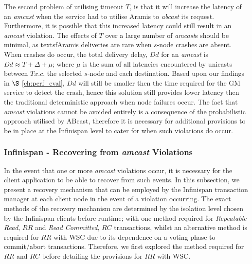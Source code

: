     The second problem of utilising timeout $T$, is that it will increase the latency of an \emph{amcast} when the service had to utilise \textsf{Aramis} to \emph{abcast} its request.  Furthermore, it is possible that this increased latency could still result in an \emph{amcast} violation.  The effects of $T$ over a large number of \emph{amcast}s should be minimal, as textsf{Aramis} deliveries are rare when $s$-node crashes are absent.  When crashes do occur, the total delivery delay, $Dd$ for an \emph{amcast} is $Dd \approx T + \Delta + \mu$; where $\mu$ is the sum of all latencies encountered by unicasts between $Tx.c$, the selected $s$-node and each destination.  Based upon our findings in $\S$ \ref{ch:perf_eval}, $Dd$ will still be smaller then the time required for the GM service to detect the crash, hence this solution still provides lower latency then the traditional deterministic approach when node failures occur.  The fact that \emph{amcast} violations cannot be avoided entirely is a consequence of the probabilistic approach utilised by \textsf{ABcast}, therefore it is necessary for additional provisions to be in place at the Infinispan level to cater for when such violations do occur.  
    
    \subsubsection*{Infinispan - Recovering from \emph{amcast} Violations}
    In the event that one or more \emph{amcast} violations occur, it is necessary for the client application to be able to recover from such events.  In this subsection, we present a recovery mechanism that can be employed by the Infinispan transaction manager at each client node in the event of a violation occurring.  The exact methods of the recovery mechanism are determined by the isolation level chosen by the Infinispan clients before runtime; with one method required for \emph{Repeatable Read}, $RR$ and \emph{Read Committed}, $RC$ transactions, whilst an alternative method is required for $RR$ with WSC due to its dependence on a voting phase to commit/abort transactions.  Therefore, we first explored the method required for $RR$ and $RC$ before detailing the provisions for $RR$ with WSC.  
    
